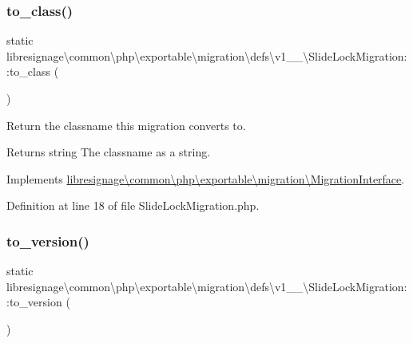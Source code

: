 \subsubsection{\texorpdfstring{to\+\_\+class()}{to\_class()}}
{\footnotesize\ttfamily static libresignage\textbackslash{}common\textbackslash{}php\textbackslash{}exportable\textbackslash{}migration\textbackslash{}defs\textbackslash{}v1\+\_\+\_\textbackslash{}\+Slide\+Lock\+Migration\+::to\+\_\+class (\begin{DoxyParamCaption}{ }\end{DoxyParamCaption})\hspace{0.3cm}{\ttfamily [static]}}

Return the classname this migration converts to.

\begin{DoxyReturn}{Returns}
string The classname as a string. 
\end{DoxyReturn}


Implements \hyperlink{interfacelibresignage_1_1common_1_1php_1_1exportable_1_1migration_1_1MigrationInterface_ab1f33cdd8684595d6b000bcbc7c4d5a4}{libresignage\textbackslash{}common\textbackslash{}php\textbackslash{}exportable\textbackslash{}migration\textbackslash{}\+Migration\+Interface}.



Definition at line 18 of file Slide\+Lock\+Migration.\+php.

\mbox{\label{classlibresignage_1_1common_1_1php_1_1exportable_1_1migration_1_1defs_1_1v1__1__0_1_1SlideLockMigration_a16116f2b333e8d0a86d3cd92a809820b}} 
\subsubsection{\texorpdfstring{to\+\_\+version()}{to\_version()}}
{\footnotesize\ttfamily static libresignage\textbackslash{}common\textbackslash{}php\textbackslash{}exportable\textbackslash{}migration\textbackslash{}defs\textbackslash{}v1\+\_\+\_\textbackslash{}\+Slide\+Lock\+Migration\+::to\+\_\+version (\begin{DoxyParamCaption}{ }\end{DoxyParamCaption})\hspace{0.3cm}{\ttfamily [static]}}

